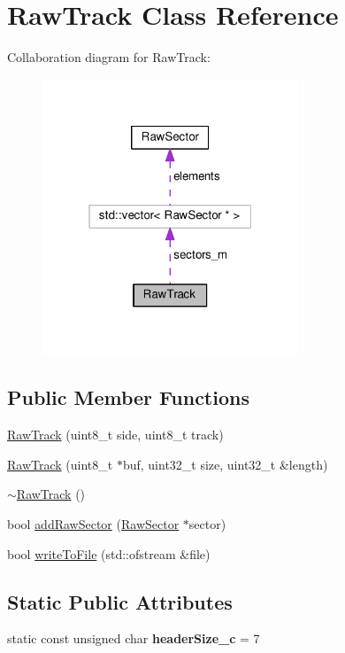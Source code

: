 \hypertarget{classRawTrack}{}\section{Raw\+Track Class Reference}
\label{classRawTrack}


Collaboration diagram for Raw\+Track\+:\nopagebreak
\begin{figure}[H]
\begin{center}
\leavevmode
\includegraphics[width=217pt]{classRawTrack__coll__graph}
\end{center}
\end{figure}
\subsection*{Public Member Functions}
\begin{DoxyCompactItemize}
\item 
\hyperlink{classRawTrack_a0cbbfccb5147d2bab4b7f993729dad2c}{Raw\+Track} (uint8\+\_\+t side, uint8\+\_\+t track)
\item 
\hyperlink{classRawTrack_a85a059917e73c541b9823ef9a85d5f76}{Raw\+Track} (uint8\+\_\+t $\ast$buf, uint32\+\_\+t size, uint32\+\_\+t \&length)
\item 
\hyperlink{classRawTrack_a5db4243f25876da1d313e585905f9af9}{$\sim$\+Raw\+Track} ()
\item 
bool \hyperlink{classRawTrack_ab401f274eed5183474c82fca1c00716a}{add\+Raw\+Sector} (\hyperlink{classRawSector}{Raw\+Sector} $\ast$sector)
\item 
bool \hyperlink{classRawTrack_aa88642dea527ea5af9dc076d58bb0b2e}{write\+To\+File} (std\+::ofstream \&file)
\end{DoxyCompactItemize}
\subsection*{Static Public Attributes}
\begin{DoxyCompactItemize}
\item 
\hypertarget{classRawTrack_a619ccb2b639303075459df45bef473b3}{}static const unsigned char {\bfseries header\+Size\+\_\+c} = 7\label{classRawTrack_a619ccb2b639303075459df45bef473b3}

\end{DoxyCompactItemize}
